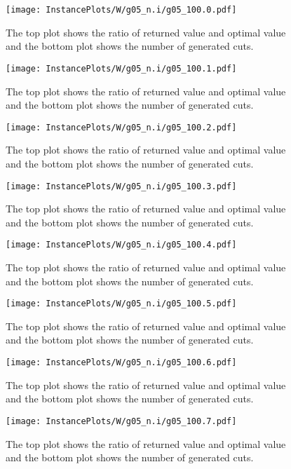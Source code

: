 \documentclass[10pt,a4paper]{article}
\begin{document}
\begin{figure}[H]
\texttt{[image: InstancePlots/W/g05\_n.i/g05\_100.0.pdf]}
\caption{The top plot shows the ratio of returned value and optimal value     and the bottom plot shows the number of generated cuts.}
\end{figure}

\begin{figure}[H]
\texttt{[image: InstancePlots/W/g05\_n.i/g05\_100.1.pdf]}
\caption{The top plot shows the ratio of returned value and optimal value     and the bottom plot shows the number of generated cuts.}
\end{figure}

\begin{figure}[H]
\texttt{[image: InstancePlots/W/g05\_n.i/g05\_100.2.pdf]}
\caption{The top plot shows the ratio of returned value and optimal value     and the bottom plot shows the number of generated cuts.}
\end{figure}

\begin{figure}[H]
\texttt{[image: InstancePlots/W/g05\_n.i/g05\_100.3.pdf]}
\caption{The top plot shows the ratio of returned value and optimal value     and the bottom plot shows the number of generated cuts.}
\end{figure}

\begin{figure}[H]
\texttt{[image: InstancePlots/W/g05\_n.i/g05\_100.4.pdf]}
\caption{The top plot shows the ratio of returned value and optimal value     and the bottom plot shows the number of generated cuts.}
\end{figure}

\begin{figure}[H]
\texttt{[image: InstancePlots/W/g05\_n.i/g05\_100.5.pdf]}
\caption{The top plot shows the ratio of returned value and optimal value     and the bottom plot shows the number of generated cuts.}
\end{figure}

\begin{figure}[H]
\texttt{[image: InstancePlots/W/g05\_n.i/g05\_100.6.pdf]}
\caption{The top plot shows the ratio of returned value and optimal value     and the bottom plot shows the number of generated cuts.}
\end{figure}

\begin{figure}[H]
\texttt{[image: InstancePlots/W/g05\_n.i/g05\_100.7.pdf]}
\caption{The top plot shows the ratio of returned value and optimal value     and the bottom plot shows the number of generated cuts.}
\end{figure}
\end{document}
